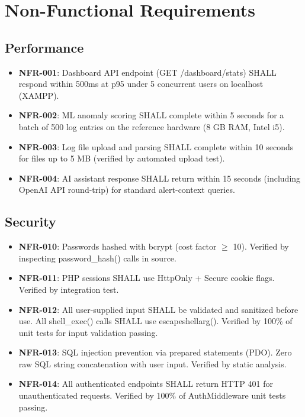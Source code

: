 \documentclass[12pt,a4paper]{report}
\begin{document}
	\section{Non-Functional Requirements}
	
	\subsection{Performance}
	\begin{itemize}
		\item \textbf{NFR-001}: Dashboard API endpoint (GET /dashboard/stats) SHALL respond within 500ms at p95 under 5 concurrent users on localhost (XAMPP).
		\item \textbf{NFR-002}: ML anomaly scoring SHALL complete within 5 seconds for a batch of 500 log entries on the reference hardware (8 GB RAM, Intel i5).
		\item \textbf{NFR-003}: Log file upload and parsing SHALL complete within 10 seconds for files up to 5 MB (verified by automated upload test).
		\item \textbf{NFR-004}: AI assistant response SHALL return within 15 seconds (including OpenAI API round-trip) for standard alert-context queries.
	\end{itemize}
	
	\subsection{Security}
	\begin{itemize}
		\item \textbf{NFR-010}: Passwords hashed with bcrypt (cost factor $\geq$ 10). Verified by inspecting password\_hash() calls in source.
		\item \textbf{NFR-011}: PHP sessions SHALL use HttpOnly + Secure cookie flags. Verified by integration test.
		\item \textbf{NFR-012}: All user-supplied input SHALL be validated and sanitized before use. All shell\_exec() calls SHALL use escapeshellarg(). Verified by 100\% of unit tests for input validation passing.
		\item \textbf{NFR-013}: SQL injection prevention via prepared statements (PDO). Zero raw SQL string concatenation with user input. Verified by static analysis.
		\item \textbf{NFR-014}: All authenticated endpoints SHALL return HTTP 401 for unauthenticated requests. Verified by 100\% of AuthMiddleware unit tests passing.
	\end{itemize}
	
\end{document}
